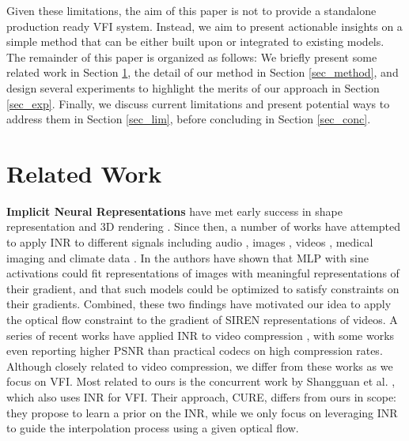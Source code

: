 \documentclass{article}
\begin{document}

Given these limitations, the aim of this paper is not to provide a standalone production ready VFI system.
Instead, we aim to present actionable insights on a simple method
that can be either built upon or integrated to existing models.
The remainder of this paper is organized as follows:
We briefly present some related work in Section \ref{sec_related},
the detail of our method in Section \ref{sec_method},
and design several experiments to highlight the merits of our approach in Section \ref{sec_exp}.
Finally, we discuss current limitations and present potential ways to address them in Section \ref{sec_lim},
before concluding in Section \ref{sec_conc}.

\section{Related Work}
\label{sec_related}

\textbf{ Implicit Neural Representations} have met early success in
shape representation and 3D rendering \cite{park2019deepsdf} \cite{mescheder2019occupancy} \cite{mildenhall2020nerf}.
Since then, a number of works have attempted to
apply INR to different signals including audio \cite{sitzmann2020implicit} \cite{kim2022learning}, images \cite{dupont2021coin} \cite{dupont2022coin++}, videos \cite{chen2021nerv} \cite{shangguan2022learning} \cite{rho2022neural},
medical imaging and climate data \cite{dupont2022coin++}.
In \cite{sitzmann2020implicit} the authors have shown that MLP with sine activations
could fit representations of images with meaningful representations of their gradient,
and that such models could be optimized to satisfy constraints on their gradients.
Combined, these two findings have motivated our idea to apply the optical
flow constraint to the gradient of SIREN representations of videos.
A series of recent works have applied INR to video compression \cite{zhang2021implicit} \cite{chen2021nerv} ,
with some works \cite{chen2021nerv} even reporting higher PSNR
than practical codecs on high compression rates.
Although closely related to video compression,
we differ from these works as we focus on VFI.
Most related to ours is the concurrent work by Shangguan et al. \cite{shangguan2022learning}, which also uses INR for VFI.
Their approach, CURE, differs from ours in scope:
they propose to learn a prior on the INR,
while we only focus on leveraging INR to guide the interpolation process using a given optical flow.
\end{document}
